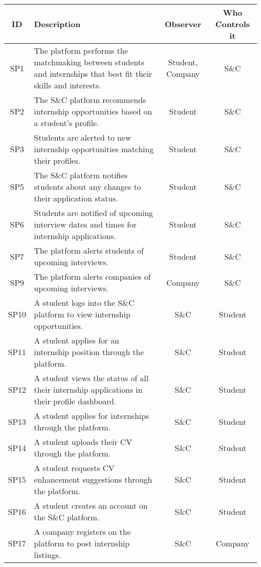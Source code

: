 \begin{longtable}{|c|p{5cm}|c|c|}
\hline
\textbf{ID} & \textbf{Description} & \textbf{Observer} & \textbf{Who Controls it} \\ \hline
SP1 & The platform performs the matchmaking between students and internships that best fit their skills and interests. & Student, Company & S\&C \\ \hline
SP2 & The S\&C platform recommends internship opportunities based on a student's profile. & Student & S\&C \\ \hline
SP3 & Students are alerted to new internship opportunities matching their profiles. & Student & S\&C \\ \hline

SP5 & The S\&C platform notifies students about any changes to their application status. & Student & S\&C \\ \hline
SP6 & Students are notified of upcoming interview dates and times for internship applications. & Student & S\&C \\ \hline
SP7 & The platform alerts students of upcoming interviews. & Student & S\&C \\ \hline
SP9 & The platform alerts companies of upcoming interviews. & Company & S\&C \\ \hline

SP10 & A student logs into the S\&C platform to view internship opportunities. & S\&C & Student \\ \hline
SP11 & A student applies for an internship position through the platform. & S\&C & Student \\ \hline
SP12 & A student views the status of all their internship applications in their profile dashboard. & S\&C & Student \\ \hline
SP13 & A student applies for internships through the platform. & S\&C & Student \\ \hline

SP14 & A student uploads their CV through the platform. & S\&C & Student \\ \hline
SP15 & A student requests CV enhancement suggestions through the platform. & S\&C & Student \\ \hline

SP16 & A student creates an account on the S\&C platform. & S\&C & Student \\ \hline
SP17 & A company registers on the platform to post internship listings. & S\&C & Company \\ \hline


\end{longtable}
